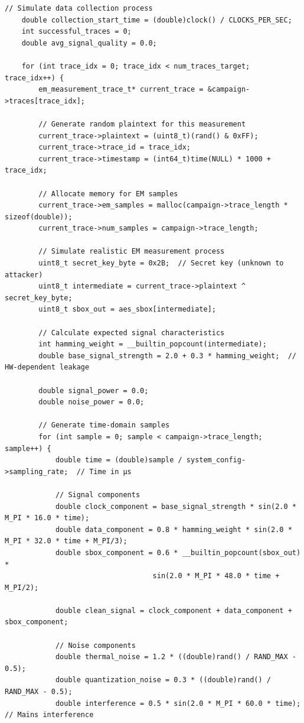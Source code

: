 \documentclass[11pt,a4paper]{article}
\theoremstyle{definition}
\begin{document}
\begin{lstlisting}[caption={Complete EM Attack Methodology Framework Implementation}]
    // Simulate data collection process
    double collection_start_time = (double)clock() / CLOCKS_PER_SEC;
    int successful_traces = 0;
    double avg_signal_quality = 0.0;
    
    for (int trace_idx = 0; trace_idx < num_traces_target; trace_idx++) {
        em_measurement_trace_t* current_trace = &campaign->traces[trace_idx];
        
        // Generate random plaintext for this measurement
        current_trace->plaintext = (uint8_t)(rand() & 0xFF);
        current_trace->trace_id = trace_idx;
        current_trace->timestamp = (int64_t)time(NULL) * 1000 + trace_idx;
        
        // Allocate memory for EM samples
        current_trace->em_samples = malloc(campaign->trace_length * sizeof(double));
        current_trace->num_samples = campaign->trace_length;
        
        // Simulate realistic EM measurement process
        uint8_t secret_key_byte = 0x2B;  // Secret key (unknown to attacker)
        uint8_t intermediate = current_trace->plaintext ^ secret_key_byte;
        uint8_t sbox_out = aes_sbox[intermediate];
        
        // Calculate expected signal characteristics
        int hamming_weight = __builtin_popcount(intermediate);
        double base_signal_strength = 2.0 + 0.3 * hamming_weight;  // HW-dependent leakage
        
        double signal_power = 0.0;
        double noise_power = 0.0;
        
        // Generate time-domain samples
        for (int sample = 0; sample < campaign->trace_length; sample++) {
            double time = (double)sample / system_config->sampling_rate;  // Time in μs
            
            // Signal components
            double clock_component = base_signal_strength * sin(2.0 * M_PI * 16.0 * time);
            double data_component = 0.8 * hamming_weight * sin(2.0 * M_PI * 32.0 * time + M_PI/3);
            double sbox_component = 0.6 * __builtin_popcount(sbox_out) * 
                                   sin(2.0 * M_PI * 48.0 * time + M_PI/2);
            
            double clean_signal = clock_component + data_component + sbox_component;
            
            // Noise components
            double thermal_noise = 1.2 * ((double)rand() / RAND_MAX - 0.5);
            double quantization_noise = 0.3 * ((double)rand() / RAND_MAX - 0.5);
            double interference = 0.5 * sin(2.0 * M_PI * 60.0 * time);  // Mains interference
            

\end{lstlisting}
\end{document}
